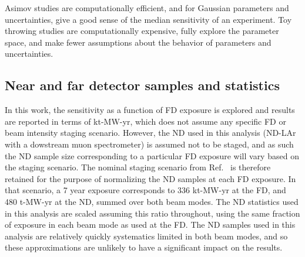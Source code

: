 Asimov studies are computationally efficient, and for Gaussian parameters and uncertainties, give a good sense of the median sensitivity of an experiment. Toy throwing studies are computationally expensive, fully explore the parameter space, and make fewer assumptions about the behavior of parameters and uncertainties.


\subsection{Near and far detector samples and statistics}
In this work, the sensitivity as a function of FD exposure is explored and results are reported in terms of kt-MW-yr, which does not assume any specific FD or beam intensity staging scenario. However, the ND used in this analysis (ND-LAr with a dowstream muon spectrometer) is assumed not to be staged, and as such the ND sample size corresponding to a particular FD exposure will vary based on the staging scenario. The nominal staging scenario from Ref.~\cite{Abi:2020qib} is therefore retained for the purpose of normalizing the ND samples at each FD exposure. In that scenario, a 7 year exposure corresponds to 336 kt-MW-yr at the FD, and 480 t-MW-yr at the ND, summed over both beam modes. The ND statistics used in this analysis are scaled assuming this ratio throughout, using the same fraction of exposure in each beam mode as used at the FD. The ND samples used in this analysis are relatively quickly systematics limited in both beam modes, and so these approximations are unlikely to have a significant impact on the results.

